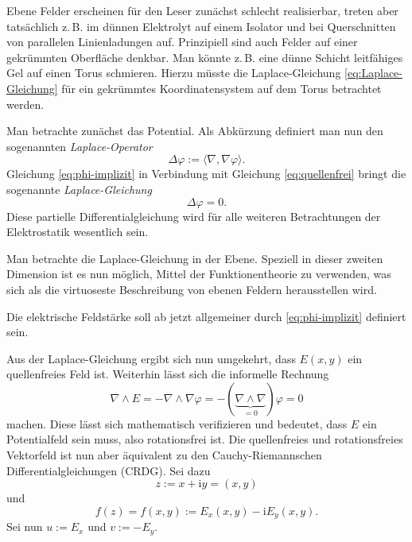 \documentclass[a4paper,10pt,fleqn,twocolumn,twoside]{article}
\newcommand{\ui}{\mathrm i}
\begin{document}
Ebene Felder erscheinen für den Leser zunächst schlecht realisierbar,
treten aber tatsächlich z.\,B. im dünnen Elektrolyt auf einem
Isolator und bei Querschnitten von parallelen Linienladungen auf.
Prinzipiell sind auch Felder auf einer gekrümmten Oberfläche
denkbar. Man könnte z.\,B. eine dünne Schicht leitfähiges Gel
auf einen Torus schmieren. Hierzu müsste die Laplace-Gleichung
\eqref{eq:Laplace-Gleichung} für ein gekrümmtes Koordinatensystem
auf dem Torus betrachtet werden.

Man betrachte zunächst das Potential.
Als Abkürzung definiert man nun den sogenannten \emph{Laplace-Operator}
\begin{equation}
\Delta\varphi := \langle\nabla,\nabla\varphi\rangle.
\end{equation}
Gleichung
\eqref{eq:phi-implizit} in Verbindung mit Gleichung
\eqref{eq:quellenfrei} bringt die sogenannte \emph{Laplace-Gleichung}
\begin{equation}\label{eq:Laplace-Gleichung}
\Delta\varphi = 0.
\end{equation}
Diese partielle Differentialgleichung wird für alle weiteren
Betrachtungen der Elektrostatik wesentlich sein.

Man betrachte die Laplace-Gleichung in der Ebene.
Speziell in dieser zweiten Dimension ist es nun möglich,
Mittel der Funktionentheorie zu verwenden,
was sich als die virtuoseste Beschreibung von ebenen Feldern
herausstellen wird.

Die elektrische Feldstärke soll ab jetzt allgemeiner durch
\eqref{eq:phi-implizit} definiert sein.

Aus der Laplace-Gleichung ergibt sich nun umgekehrt, dass $E(x,y)$
ein quellenfreies Feld ist. Weiterhin lässt sich die
informelle Rechnung
\begin{equation}
\nabla\wedge E
= -\nabla\wedge\nabla\varphi
= -(\underbrace{\nabla\wedge\nabla}_{=0})\varphi =0
\end{equation}
machen. Diese lässt sich mathematisch verifizieren und bedeutet,
dass $E$ ein Potentialfeld sein muss, also rotationsfrei ist.
Die quellenfreies und rotationsfreies Vektorfeld ist nun aber
äquivalent zu den Cauchy-Riemannschen Differentialgleichungen
(CRDG). Sei dazu
\begin{equation}
z:=x+\ui y=(x,y)
\end{equation}
und
\begin{equation}
f(z)=f(x,y):=E_x(x,y)-\mathrm{i}E_y(x,y).
\end{equation}
Sei nun $u:=E_x$ und $v:=-E_y$.
\end{document}
